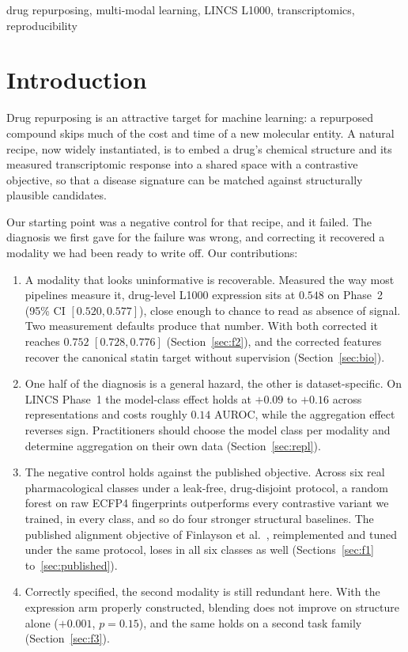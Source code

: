\documentclass[conference]{IEEEtran}
\begin{document}
\begin{IEEEkeywords}
drug repurposing, multi-modal learning, LINCS L1000, transcriptomics, reproducibility
\end{IEEEkeywords}


\section{Introduction}

Drug repurposing is an attractive target for machine learning: a repurposed
compound skips much of the cost and time of a new molecular entity. A natural
recipe, now widely instantiated, is to embed a drug's chemical structure and its
measured transcriptomic response into a shared space with a contrastive
objective, so that a disease signature can be matched against structurally
plausible candidates.

Our starting point was a negative control for that recipe, and it failed. The
diagnosis we first gave for the failure was wrong, and correcting it recovered a
modality we had been ready to write off. Our contributions:

\begin{enumerate}
    \item A modality that looks uninformative is recoverable. Measured
    the way most pipelines measure it, drug-level L1000 expression sits at
    $0.548$ on Phase~2 (95\% CI $[0.520, 0.577]$), close enough to chance to
    read as absence of signal. Two measurement defaults produce that number.
    With both corrected it reaches $0.752$ $[0.728, 0.776]$ (Section~\ref{sec:f2}),
    and the corrected features recover the canonical statin target without
    supervision (Section~\ref{sec:bio}).

    \item One half of the diagnosis is a general hazard, the other is
    dataset-specific. On LINCS Phase~1 the model-class effect holds at $+0.09$
    to $+0.16$ across representations and costs roughly $0.14$ AUROC, while the
    aggregation effect reverses sign. Practitioners should choose the model class
    per modality and determine aggregation on their own data
    (Section~\ref{sec:repl}).

    \item The negative control holds against the published
    objective. Across six real pharmacological classes under a
    leak-free, drug-disjoint protocol, a random forest on raw ECFP4 fingerprints
    outperforms every contrastive variant we trained, in every class, and so do
    four stronger structural baselines. The published alignment objective of
    Finlayson et al.~\cite{finlayson2021}, reimplemented and tuned under the
    same protocol, loses in all six classes as well
    (Sections~\ref{sec:f1} to~\ref{sec:published}).

    \item Correctly specified, the second modality is still redundant
    here. With the expression arm properly constructed, blending does not
    improve on structure alone ($+0.001$, $p{=}0.15$), and the same holds on a
    second task family (Section~\ref{sec:f3}).
\end{enumerate}
\end{document}
